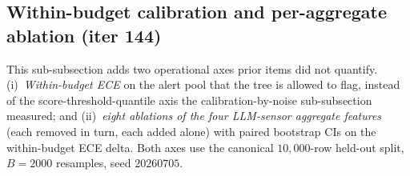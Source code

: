 \subsection{Within-budget calibration and per-aggregate ablation (iter 144)}
\label{sec:p8-evidence-within-budget}

This sub-subsection adds two operational axes prior items did not
quantify. (i)~\emph{Within-budget ECE} on the alert pool that the tree
is allowed to flag, instead of the score-threshold-quantile axis the
calibration-by-noise sub-subsection measured; and (ii)~\emph{eight
ablations of the four LLM-sensor aggregate features} (each removed in
turn, each added alone) with paired bootstrap CIs on the within-budget
ECE delta. Both axes use the canonical $10{,}000$-row held-out split,
$B{=}2000$ resamples, seed $20260705$.

